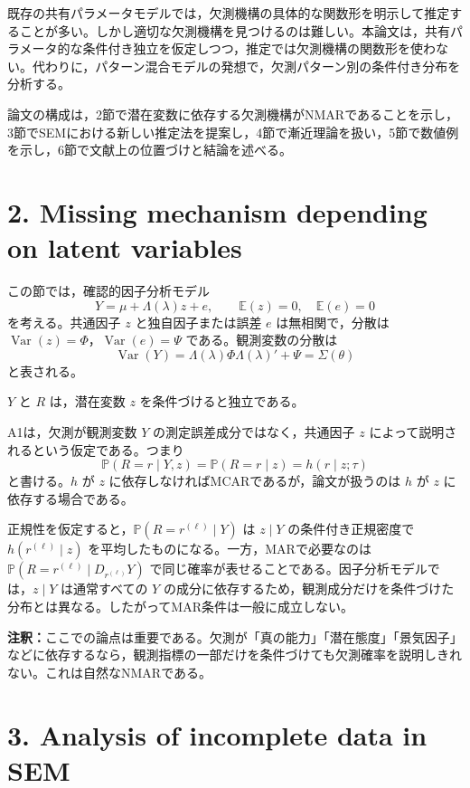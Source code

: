 \documentclass[dvipdfmx,autodetect-engine]{jsarticle}
\newcommand{\E}{\mathbb{E}}
\newcommand{\Prb}{\mathbb{P}}
\newcommand{\Var}{\operatorname{Var}}
\newcommand{\note}[1]{\par\smallskip\noindent\textbf{注釈：}#1\par\smallskip}
\begin{document}
既存の共有パラメータモデルでは，欠測機構の具体的な関数形を明示して推定することが多い。しかし適切な欠測機構を見つけるのは難しい。本論文は，共有パラメータ的な条件付き独立を仮定しつつ，推定では欠測機構の関数形を使わない。代わりに，パターン混合モデルの発想で，欠測パターン別の条件付き分布を分析する。

論文の構成は，2節で潜在変数に依存する欠測機構がNMARであることを示し，3節でSEMにおける新しい推定法を提案し，4節で漸近理論を扱い，5節で数値例を示し，6節で文献上の位置づけと結論を述べる。

\section{2. Missing mechanism depending on latent variables}

この節では，確認的因子分析モデル
\[
Y=\mu+\Lambda(\lambda)z+e,\qquad \E(z)=0,\quad \E(e)=0
\]
を考える。共通因子 $z$ と独自因子または誤差 $e$ は無相関で，分散は $\Var(z)=\Phi$，$\Var(e)=\Psi$ である。観測変数の分散は
\[
\Var(Y)=\Lambda(\lambda)\Phi\Lambda(\lambda)'+\Psi=\Sigma(\theta)
\]
と表される。

\begin{description}[leftmargin=3.2em]
\item[A1] $Y$ と $R$ は，潜在変数 $z$ を条件づけると独立である。
\end{description}

A1は，欠測が観測変数 $Y$ の測定誤差成分ではなく，共通因子 $z$ によって説明されるという仮定である。つまり
\[
\Prb(R=r\mid Y,z)=\Prb(R=r\mid z)=h(r\mid z;\tau)
\]
と書ける。$h$ が $z$ に依存しなければMCARであるが，論文が扱うのは $h$ が $z$ に依存する場合である。

正規性を仮定すると，$\Prb(R=r^{(\ell)}\mid Y)$ は $z\mid Y$ の条件付き正規密度で $h(r^{(\ell)}\mid z)$ を平均したものになる。一方，MARで必要なのは $\Prb(R=r^{(\ell)}\mid D_{r^{(\ell)}}Y)$ で同じ確率が表せることである。因子分析モデルでは，$z\mid Y$ は通常すべての $Y$ の成分に依存するため，観測成分だけを条件づけた分布とは異なる。したがってMAR条件は一般に成立しない。

\note{ここでの論点は重要である。欠測が「真の能力」「潜在態度」「景気因子」などに依存するなら，観測指標の一部だけを条件づけても欠測確率を説明しきれない。これは自然なNMARである。}

\section{3. Analysis of incomplete data in SEM}
\end{document}
